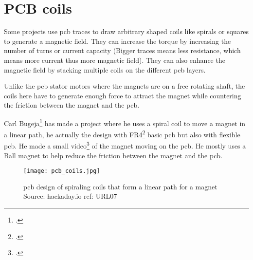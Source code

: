 \section{PCB coils}

Some projects use \gls{pcb} traces to draw arbitrary shaped coils like spirals or squares to generate a magnetic field. They can increase the torque by increasing the number of turns or current capacity (Bigger traces means less resistance, which means more current thus more magnetic field). They can also enhance the magnetic field by stacking multiple coils on the different \gls{pcb} layers.

Unlike the pcb stator motors where the magnets are on a free rotating shaft, the coils here have to generate enough force to attract the magnet while countering the friction between the magnet and the \gls{pcb}.

Carl Bugeja\footcite{noauthor_carl_nodate} has made a project where he uses a spiral coil to move a magnet in a linear path, he actually the design with FR4\footcite{noauthor_fr-4_2024} basic \gls{pcb} but also with flexible \gls{pcb}. He made a small video\footcite{carl_bugeja_actuating_2018} of the magnet moving on the \gls{pcb}. He mostly uses a Ball magnet to help reduce the friction between the magnet and the \gls{pcb}.

\begin{figure}[H]
	\centering
	\texttt{[image: pcb\_coils.jpg]}
	\caption[\gls{pcb} coils design from Carl Bugeja]{\gls{pcb} design of spiraling coils that form a linear path for a magnet Source: hackaday.io ref: URL07}
	\label{fig:pcb_coils_spiral}
\end{figure}






